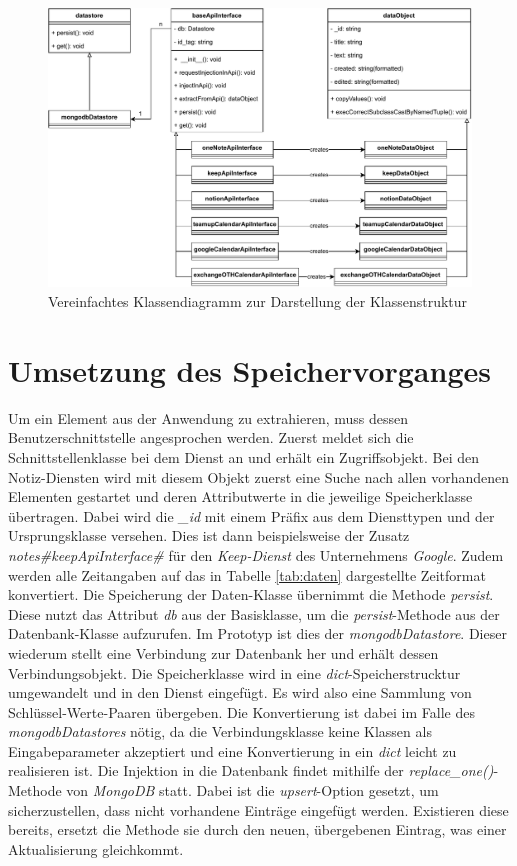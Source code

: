 \begin{figure}[H]
	\centering
	\includegraphics[width=1\textwidth]{Bilder/umsetzung/classDiagramm.pdf}
	\caption{Vereinfachtes Klassendiagramm zur Darstellung der Klassenstruktur}
	\label{fig:Klassendiagram}
\end{figure}

\section{Umsetzung des Speichervorganges}

Um ein Element aus der Anwendung zu extrahieren, muss dessen Benutzerschnittstelle angesprochen werden. Zuerst meldet sich die Schnittstellenklasse bei dem Dienst an und erhält ein Zugriffsobjekt. Bei den Notiz-Diensten wird mit diesem Objekt zuerst eine Suche nach allen vorhandenen Elementen gestartet und deren Attributwerte in die jeweilige Speicherklasse übertragen. Dabei wird die \textit{\_id} mit einem Präfix aus dem Diensttypen und der Ursprungsklasse versehen. Dies ist dann beispielsweise der Zusatz \textit{notes\#keepApiInterface\#} für den \textit{Keep-Dienst} des Unternehmens \textit{Google}. Zudem werden alle Zeitangaben auf das in Tabelle \ref{tab:daten} dargestellte Zeitformat konvertiert. Die Speicherung der Daten-Klasse übernimmt die Methode \textit{persist}. Diese nutzt das Attribut \textit{db} aus der Basisklasse, um die \textit{persist}-Methode aus der Datenbank-Klasse aufzurufen. Im Prototyp ist dies der \textit{mongodbDatastore}. Dieser wiederum stellt eine Verbindung zur Datenbank her und erhält dessen Verbindungsobjekt. Die Speicherklasse wird in eine \textit{dict}-Speicherstrucktur umgewandelt und in den Dienst eingefügt. Es wird also eine Sammlung von Schlüssel-Werte-Paaren übergeben. Die Konvertierung ist dabei im Falle des \textit{mongodbDatastores} nötig, da die Verbindungsklasse keine Klassen als Eingabeparameter akzeptiert und eine Konvertierung in ein \textit{dict} leicht zu realisieren ist. Die Injektion in die Datenbank findet mithilfe der \textit{replace\_one()}-Methode von \textit{MongoDB} statt. Dabei ist die \textit{upsert}-Option gesetzt, um sicherzustellen, dass nicht vorhandene Einträge eingefügt werden. Existieren diese bereits, ersetzt die Methode sie durch den neuen, übergebenen Eintrag, was einer Aktualisierung gleichkommt.

